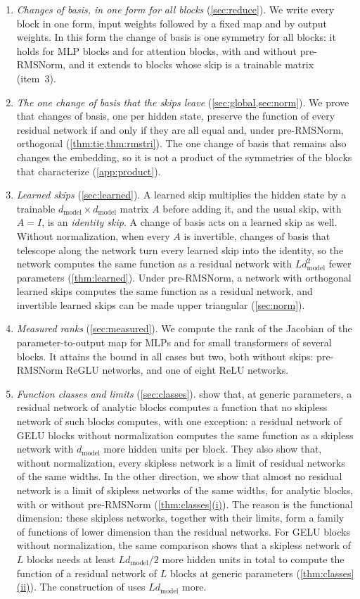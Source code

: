 \documentclass[10pt]{article}
\theoremstyle{definition}
\theoremstyle{remark}
\newcommand{\dm}{d_{\mathrm{model}}}
\DeclareRobustCommand{\cpref}[2]{\hyperref[#1:#2]{\cref*{#1}(#2)}}
\begin{document}
\begin{enumerate}[label=\arabic*.]
\item \textit{Changes of basis, in one form for all blocks} (\cref{sec:reduce}). We write every block in one form, input weights followed by a fixed map and by output weights. In this form the change of basis is one symmetry for all blocks: it holds for MLP blocks and for attention blocks, with and without pre-RMSNorm, and it extends to blocks whose skip is a trainable matrix (item~3).
\item \textit{The one change of basis that the skips leave} (\cref{sec:global,sec:norm}). We prove that changes of basis, one per hidden state, preserve the function of every residual network if and only if they are all equal and, under pre-RMSNorm, orthogonal (\cref{thm:tie,thm:rmstri}). The one change of basis that remains also changes the embedding, so it is not a product of the symmetries of the blocks that \citet{wang2025gauge} characterize (\cref{app:product}).
\item \textit{Learned skips} (\cref{sec:learned}). A learned skip multiplies the hidden state by a trainable $\dm\times\dm$ matrix $A$ before adding it, and the usual skip, with $A = I$, is an \emph{identity skip}. A change of basis acts on a learned skip as well. Without normalization, when every $A$ is invertible, changes of basis that telescope along the network turn every learned skip into the identity, so the network computes the same function as a residual network with $L\dm^2$ fewer parameters (\cref{thm:learned}). Under pre-RMSNorm, a network with orthogonal learned skips computes the same function as a residual network, and invertible learned skips can be made upper triangular (\cref{sec:norm}).
\item \textit{Measured ranks} (\cref{sec:measured}). We compute the rank of the Jacobian of the parameter-to-output map for MLPs and for small transformers of several blocks. It attains the bound in all cases but two, both without skips: pre-RMSNorm ReGLU networks, and one of eight ReLU networks.
\item \textit{Function classes and limits} (\cref{sec:classes}). \citet{mijoski2026worth} show that, at generic parameters, a residual network of analytic blocks computes a function that no skipless network of such blocks computes, with one exception: a residual network of GELU blocks without normalization computes the same function as a skipless network with $\dm$ more hidden units per block. They also show that, without normalization, every skipless network is a limit of residual networks of the same widths. In the other direction, we show that almost no residual network is a limit of skipless networks of the same widths, for analytic blocks, with or without pre-RMSNorm (\cpref{thm:classes}{i}). The reason is the functional dimension: these skipless networks, together with their limits, form a family of functions of lower dimension than the residual networks. For GELU blocks without normalization, the same comparison shows that a skipless network of $L$ blocks needs at least $L\dm/2$ more hidden units in total to compute the function of a residual network of $L$ blocks at generic parameters (\cpref{thm:classes}{ii}). The construction of \citet{mijoski2026worth} uses $L\dm$ more.

\end{enumerate}
\end{document}
